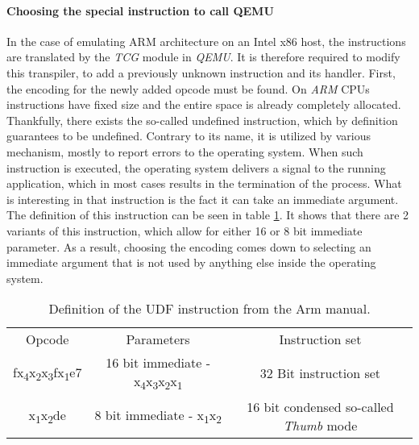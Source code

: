 \paragraph{Choosing the special instruction to call QEMU}
In the case of emulating ARM architecture on an Intel x86 host, the instructions are translated by the \textit{TCG} module in \textit{QEMU}. It is therefore required to modify this transpiler, to add a previously unknown instruction and its handler. First, the encoding for the newly added opcode must be found. On \textit{ARM} CPUs instructions have fixed size and the entire space is already completely allocated. Thankfully, there exists the so-called undefined instruction, which by definition guarantees to be undefined. Contrary to its name, it is utilized by various mechanism, mostly to report errors to the operating system. When such instruction is executed, the operating system delivers a signal to the running application, which in most cases results in the termination of the process. What is interesting in that instruction is the fact it can take an immediate argument. The definition of this instruction can be seen in table \ref{tab:armudf}. It shows that there are 2 variants of this instruction, which allow for either 16 or 8 bit immediate parameter. As a result, choosing the encoding comes down to selecting an immediate argument that is not used by anything else inside the operating system. 

\begin{table}[h!]
    \centering
    \begin{tabular}{c|c|c}
        Opcode & Parameters & Instruction set \\
        fx\textsubscript{4}x\textsubscript{2}x\textsubscript{3}fx\textsubscript{1}e7 & 16 bit immediate - x\textsubscript{4}x\textsubscript{3}x\textsubscript{2}x\textsubscript{1} & 32 Bit instruction set \\

        x\textsubscript{1}x\textsubscript{2}de & 8 bit immediate - x\textsubscript{1}x\textsubscript{2} & 16 bit condensed so-called \textit{Thumb} mode \\
    \end{tabular}
    \caption{Definition of the UDF instruction from the Arm manual.}
    \label{tab:armudf}
\end{table}

